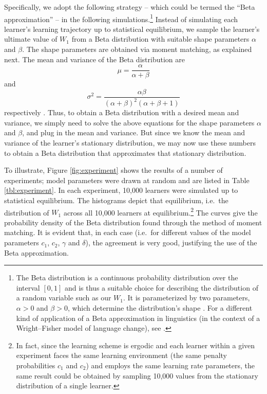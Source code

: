 Specifically, we adopt the following strategy -- which could be termed
the ``Beta approximation'' -- in the following simulations.\footnote{The
  Beta distribution is a continuous probability distribution over the
  interval \([0, 1]\) and is thus a suitable choice for describing the
  distribution of a random variable such as our \(W_1\). It is
  parameterized by two parameters, \(\alpha > 0\) and \(\beta > 0\),
  which determine the distribution's shape \autocite[see
  e.g.][151--152]{Samaniego2014}. For a different kind of application of
  a Beta approximation in linguistics (in the context of a
  Wright--Fisher model of language change), see
  \textcite{GuerreroEtAl2025}.} Instead of simulating each learner's
learning trajectory up to statistical equilibrium, we sample the
learner's ultimate value of \(W_1\) from a Beta distribution with
suitable shape parameters \(\alpha\) and \(\beta\). The shape parameters
are obtained via moment matching, as explained next. The mean and
variance of the Beta distribution are \begin{equation}\label{eq:mu}
\mu = \frac{\alpha}{\alpha + \beta}
\end{equation} and \begin{equation}\label{eq:sigma}
\sigma^2 = \frac{\alpha\beta}{(\alpha + \beta)^2(\alpha + \beta + 1)}
\end{equation} respectively \autocite[see e.g.][151]{Samaniego2014}.
Thus, to obtain a Beta distribution with a desired mean and variance, we
simply need to solve the above equations for the shape parameters
\(\alpha\) and \(\beta\), and plug in the mean and variance. But since
we know the mean and variance of the learner's stationary distribution,
we may now use these numbers to obtain a Beta distribution that
approximates that stationary distribution.

To illustrate, Figure \ref{fig:experiment} shows the results of a number
of experiments; model parameters were drawn at random and are listed in
Table \ref{tbl:experiment}. In each experiment, 10,000 learners were
simulated up to statistical equilibrium. The histograms depict that
equilibrium, i.e.~the distribution of \(W_1\) across all 10,000 learners
at equilibrium.\footnote{In fact, since the learning scheme is ergodic
  and each learner within a given experiment faces the same learning
  environment (the same penalty probabilities \(c_1\) and \(c_2\)) and
  employs the same learning rate parameters, the same result could be
  obtained by sampling 10,000 values from the stationary distribution of
  a single learner.} The curves give the probability density of the Beta
distribution found through the method of moment matching. It is evident
that, in each case (i.e.~for different values of the model parameters
\(c_1\), \(c_2\), \(\gamma\) and \(\delta\)), the agreement is very
good, justifying the use of the Beta approximation.

